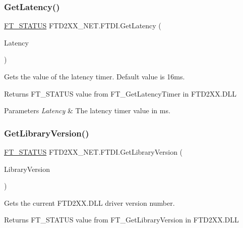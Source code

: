 \subsubsection{\texorpdfstring{GetLatency()}{GetLatency()}}
{\footnotesize\ttfamily \mbox{\hyperlink{class_f_t_d2_x_x___n_e_t_1_1_f_t_d_i_aabe20ad905cc4ccc1e35dd5b877d9a83}{F\+T\+\_\+\+S\+T\+A\+T\+US}} F\+T\+D2\+X\+X\+\_\+\+N\+E\+T.\+F\+T\+D\+I.\+Get\+Latency (\begin{DoxyParamCaption}\item[{ref byte}]{Latency }\end{DoxyParamCaption})}



Gets the value of the latency timer. Default value is 16ms. 

\begin{DoxyReturn}{Returns}
F\+T\+\_\+\+S\+T\+A\+T\+US value from F\+T\+\_\+\+Get\+Latency\+Timer in F\+T\+D2\+X\+X.\+D\+LL
\end{DoxyReturn}

\begin{DoxyParams}{Parameters}
{\em Latency} & The latency timer value in ms.\\
\hline
\end{DoxyParams}
\mbox{\label{class_f_t_d2_x_x___n_e_t_1_1_f_t_d_i_a8f16ac8cc769209367eef908551e2351}} 
\subsubsection{\texorpdfstring{GetLibraryVersion()}{GetLibraryVersion()}}
{\footnotesize\ttfamily \mbox{\hyperlink{class_f_t_d2_x_x___n_e_t_1_1_f_t_d_i_aabe20ad905cc4ccc1e35dd5b877d9a83}{F\+T\+\_\+\+S\+T\+A\+T\+US}} F\+T\+D2\+X\+X\+\_\+\+N\+E\+T.\+F\+T\+D\+I.\+Get\+Library\+Version (\begin{DoxyParamCaption}\item[{ref U\+Int32}]{Library\+Version }\end{DoxyParamCaption})}



Gets the current F\+T\+D2\+X\+X.\+D\+LL driver version number. 

\begin{DoxyReturn}{Returns}
F\+T\+\_\+\+S\+T\+A\+T\+US value from F\+T\+\_\+\+Get\+Library\+Version in F\+T\+D2\+X\+X.\+D\+LL
\end{DoxyReturn}

